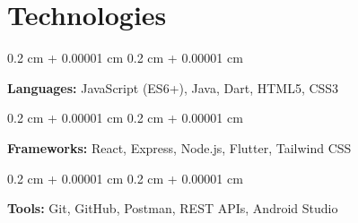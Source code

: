 \documentclass[10pt, a4paper]{article}
\newenvironment{onecolentry}{
    \begin{adjustwidth}{
        0.2 cm + 0.00001 cm
    }{
        0.2 cm + 0.00001 cm
    }
}{
    \end{adjustwidth}
} %
\begin{document}
    \section{Technologies}
    
            \begin{onecolentry}
                \textbf{Languages:} JavaScript (ES6+), Java, Dart, HTML5, CSS3
            \end{onecolentry}
            \vspace{0.1cm}
            \begin{onecolentry}
                \textbf{Frameworks:} React, Express, Node.js, Flutter, Tailwind CSS
            \end{onecolentry}
            \vspace{0.1 cm}
            \begin{onecolentry}
            \textbf{Tools:} Git, GitHub, Postman, REST APIs, Android Studio
            \end{onecolentry}
        
\end{document}
